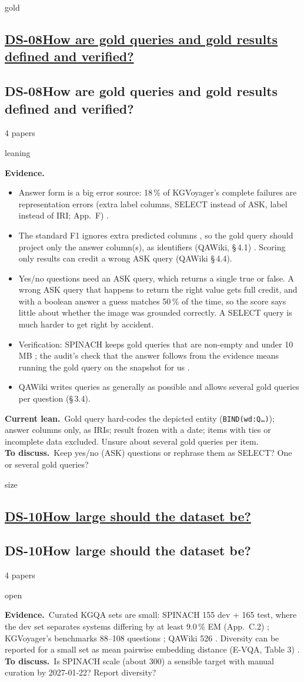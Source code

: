 \documentclass[10pt,a4paper]{article}
\newcommand{\st}[2]{\colorbox{#1}{\footnotesize\strut #2}}
\newcommand{\leaning}{\st{yellow!35}{leaning}}
\newcommand{\open}{\st{red!15}{open}}
\newcommand{\qblock}[1][]{\def\qkey{#1}\qblockx}
\newcommand{\qblockx}[4]{%
  \ifx\qkey\empty
  \subsection*{\underline{#1\quad #2}}%
  \else\hypertarget{\qkey}{}
  \subsection*{#1\quad #2}\fi%
{\footnotesize #3 papers\quad}#4\par}
\newcommand{\ev}{\textbf{Evidence.}}
\newcommand{\lean}{\textbf{Current lean.}}
\newcommand{\ask}{\textbf{To discuss.}}
\begin{document}
\qblock[gold]{DS-08}{How are gold queries and gold results defined and
verified?}{4}{\leaning}
\ev
\begin{itemize}
  \item Answer form is a big error source: 18\,\% of KGVoyager's complete
    failures are representation errors (extra label columns, SELECT instead
    of ASK, label instead of IRI; App.~F) \cite{wisam2026kgvoyager}.
  \item The standard F1 ignores extra predicted columns
    \cite[\S\,5.1]{liu2024spinach}, so the gold query should project only the
    answer column(s), as identifiers (QAWiki, \S\,4.1)
    \cite{loustaunau2025qawiki}. Scoring only results can credit a wrong ASK
    query (QAWiki \S\,4.4).
  \item Yes/no questions need an ASK query, which returns a single true or
    false. A wrong ASK query that happens to return the right value gets full
    credit, and with a boolean answer a guess matches 50\,\% of the time, so
    the score says little about whether the image was grounded correctly.
    A SELECT query is much harder to get right by accident.
  \item Verification: SPINACH keeps gold queries that are non-empty and under
    10\,MB \cite{liu2024spinach}; the audit's check that the answer follows
    from the evidence means running the gold query on the snapshot for us
    \cite{ma2026identifying}.
  \item QAWiki writes queries as generally as possible and allows several
    gold queries per question (\S\,3.4).
\end{itemize}
\lean\ Gold query hard-codes the depicted entity (\texttt{BIND(wd:Q\ldots)});
answer columns only, as IRIs; result frozen with a date; items with ties or
incomplete data excluded. Unsure about several gold queries per item.\\
\ask\ Keep yes/no (ASK) questions or rephrase them as SELECT? One or
several gold queries?

\qblock[size]{DS-10}{How large should the dataset be?}{4}{\open}
\ev\ Curated KGQA sets are small: SPINACH 155 dev + 165 test, where the dev
set separates systems differing by at least 9.0\,\% EM (App.~C.2)
\cite{liu2024spinach}; KGVoyager's benchmarks 88--108 questions
\cite{wisam2026kgvoyager}; QAWiki 526 \cite{loustaunau2025qawiki}.
Diversity can be reported for a small set as mean pairwise embedding distance
(E-VQA, Table 3) \cite{mensink2023encyclopedic}.\\
\ask\ Is SPINACH scale (about 300) a sensible target with manual curation
by 2027-01-22? Report diversity?
\end{document}
